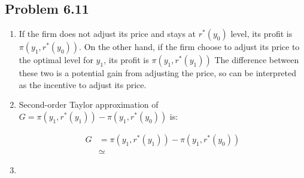 \documentclass[11pt]{amsart}
\begin{document}
\subsection{Problem 6.11}
\begin{enumerate}[label = (\alph*)]
	\item If the firm does not adjust its price and stays at $r^{*}(y_0)$ level, its profit is $\pi \left( y_1, r^{*}(y_0)  \right)$. On the other hand, if the firm choose to adjust its price to the optimal level for $y_1$, its profit is $\pi \left( y_1, r^{*}(y_1)  \right)$ The difference between these two is a potential gain from adjusting the price, so can be interpreted as the incentive to adjust its price. 
	\item Second-order Taylor approximation of $G = \pi \left( y_1, r^{*}(y_1)  \right) - \pi \left( y_1, r^{*}(y_0)  \right)$ is: 
	
	\begin{align*}
	G &= \pi \left( y_1, r^{*}(y_1)  \right) - \pi \left( y_1, r^{*}(y_0)  \right) \\
	 & \simeq 
	\end{align*}
	\item 
\end{enumerate}
\end{document}

